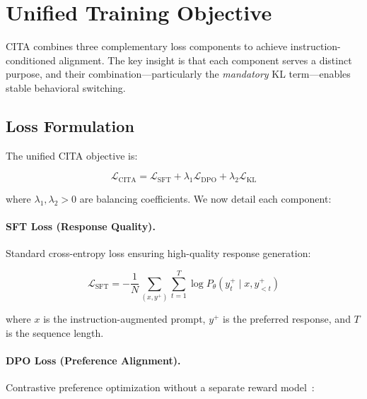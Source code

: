 
\vspace{-2mm}
\section{Unified Training Objective}
\label{sec:unified_loss}

CITA combines three complementary loss components to achieve instruction-conditioned alignment. The key insight is that each component serves a distinct purpose, and their combination---particularly the \textit{mandatory} KL term---enables stable behavioral switching.

\vspace{-2mm}
\subsection{Loss Formulation}
\label{sec:loss_formulation}

The unified CITA objective is:

\begin{equation}
\mathcal{L}_{\text{CITA}} = \mathcal{L}_{\text{SFT}} + \lambda_1 \mathcal{L}_{\text{DPO}} + \lambda_2 \mathcal{L}_{\text{KL}}
\label{eq:unified_loss}
\end{equation}

where $\lambda_1, \lambda_2 > 0$ are balancing coefficients. We now detail each component:

\paragraph{SFT Loss (Response Quality).}
Standard cross-entropy loss ensuring high-quality response generation:

\begin{equation}
\mathcal{L}_{\text{SFT}} = -\frac{1}{N} \sum_{(x, y^+)} \sum_{t=1}^{T} \log P_\theta(y_t^+ \mid x, y_{<t}^+)
\label{eq:sft_loss}
\end{equation}

where $x$ is the instruction-augmented prompt, $y^+$ is the preferred response, and $T$ is the sequence length.

\paragraph{DPO Loss (Preference Alignment).}
Contrastive preference optimization without a separate reward model~\cite{rafailov2023direct}:

